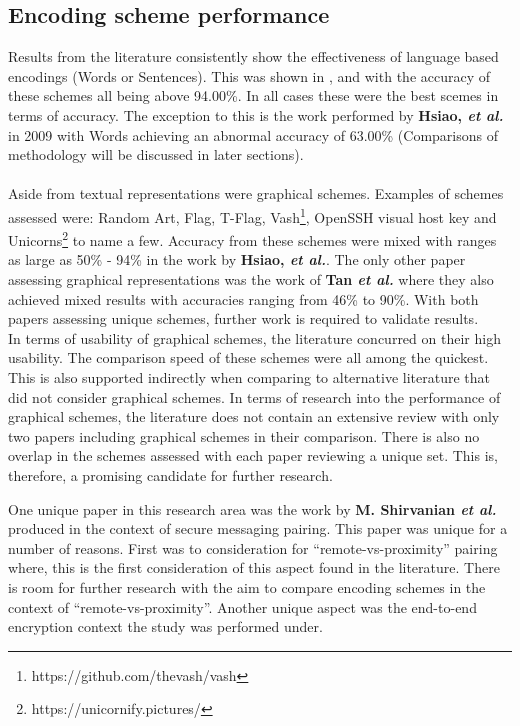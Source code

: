 \subsection*{Encoding scheme performance}
Results 
from the literature consistently show the effectiveness of language based encodings (Words or Sentences). This was shown in \cite{dechand2016empirical}, \cite{tan2017can} and \cite{kainda2009usability} with the accuracy of these schemes all being above 94.00\%. In all cases these were the best scemes in terms of accuracy. The exception to this is the work performed by \textbf{Hsiao, \textit{et al.}}\cite{hsiao2009study} in 2009 with Words achieving an abnormal accuracy of 63.00\% (Comparisons of methodology will be discussed in later sections).
\\\\
Aside from textual representations were graphical schemes. Examples of schemes assessed were: Random Art\cite{perrig1999hash}, Flag\cite{ellison2003public}, T-Flag\cite{lin2010spate}, Vash\footnote{https://github.com/thevash/vash}, OpenSSH visual host key and Unicorns\footnote{https://unicornify.pictures/} to name a few. Accuracy from these schemes were mixed with ranges as large as 50\% - 94\% in the work by \textbf{Hsiao, \textit{et al.}}\cite{hsiao2009study}. The only other paper assessing graphical representations was the work of \textbf{Tan \textit{et al.}}\cite{tan2017can} where they also achieved mixed results with accuracies ranging from 46\% to 90\%. With both papers assessing unique schemes, further work is required to validate results.
\\
In terms of usability of graphical schemes, the literature concurred on their high usability. The comparison speed of these schemes were all among the quickest. This is also supported indirectly when comparing to alternative literature that did not consider graphical schemes.\cite{dechand2016empirical}\cite{kainda2009usability}
In terms of research into the performance of graphical schemes, the literature does not contain an extensive review with only two papers including graphical schemes in their comparison. There is also no overlap in the schemes assessed with each paper reviewing a unique set. This is, therefore, a promising candidate for further research.

One unique paper in this research area was the work by \textbf{M. Shirvanian \textit{et al.}}\cite{shirvanian2017pitfalls} produced in the context of secure messaging pairing. This paper was unique for a number of reasons. First was to consideration for ``remote-vs-proximity'' pairing where, this is the first consideration of this aspect found in the literature. There is room for further research with the aim to compare encoding schemes in the context of ``remote-vs-proximity''.
Another unique aspect was the end-to-end encryption context the study was performed under.

